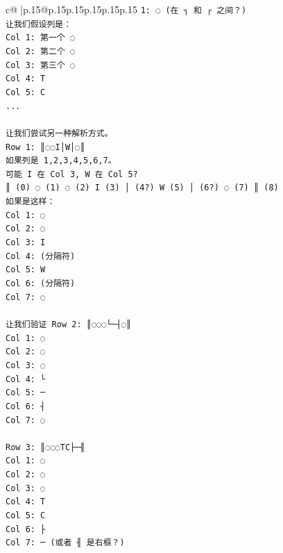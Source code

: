 \documentclass{article}
\begin{document}
{\begin{supertabular}{c@{$\;$}|p{.15\linewidth}@{}p{.15\linewidth}p{.15\linewidth}p{.15\linewidth}p{.15\linewidth}p{.15\linewidth}}
{{{\texttt{1: ◌ (在 ┐ 和 ┌ 之间？)} \\
\texttt{让我们假设列是：} \\
\texttt{Col 1: 第一个 ◌} \\
\texttt{Col 2: 第二个 ◌} \\
\texttt{Col 3: 第三个 ◌} \\
\texttt{Col 4: T} \\
\texttt{Col 5: C} \\
\texttt{...} \\
\\ 
\texttt{让我们尝试另一种解析方式。} \\
\texttt{Row 1: ║◌◌I│W│◌║} \\
\texttt{如果列是 1,2,3,4,5,6,7。} \\
\texttt{可能 I 在 Col 3, W 在 Col 5?} \\
\texttt{║ (0) ◌ (1) ◌ (2) I (3) │ (4?) W (5) │ (6?) ◌ (7) ║ (8)} \\
\texttt{如果是这样：} \\
\texttt{Col 1: ◌} \\
\texttt{Col 2: ◌} \\
\texttt{Col 3: I} \\
\texttt{Col 4: (分隔符)} \\
\texttt{Col 5: W} \\
\texttt{Col 6: (分隔符)} \\
\texttt{Col 7: ◌} \\
\\ 
\texttt{让我们验证 Row 2: ║◌◌◌└─┤◌║} \\
\texttt{Col 1: ◌} \\
\texttt{Col 2: ◌} \\
\texttt{Col 3: ◌} \\
\texttt{Col 4: └} \\
\texttt{Col 5: ─} \\
\texttt{Col 6: ┤} \\
\texttt{Col 7: ◌} \\
\\ 
\texttt{Row 3: ║◌◌◌TC├─╢} \\
\texttt{Col 1: ◌} \\
\texttt{Col 2: ◌} \\
\texttt{Col 3: ◌} \\
\texttt{Col 4: T} \\
\texttt{Col 5: C} \\
\texttt{Col 6: ├} \\
\texttt{Col 7: ─ (或者 ╢ 是右框？)} \\
}}}
\end{supertabular}}
\end{document}
